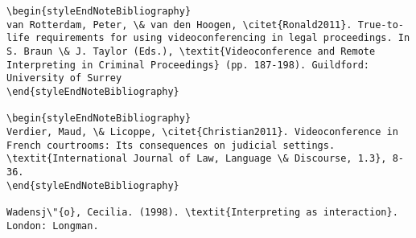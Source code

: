 \documentclass[output=paper]{langsci/langscibook}
\begin{document}
\begin{verbatim}
\begin{styleEndNoteBibliography}
van Rotterdam, Peter, \& van den Hoogen, \citet{Ronald2011}. True-to-life requirements for using videoconferencing in legal proceedings. In S. Braun \& J. Taylor (Eds.), \textit{Videoconference and Remote Interpreting in Criminal Proceedings} (pp. 187-198). Guildford: University of Surrey 
\end{styleEndNoteBibliography}

\begin{styleEndNoteBibliography}
Verdier, Maud, \& Licoppe, \citet{Christian2011}. Videoconference in French courtrooms: Its consequences on judicial settings. \textit{International Journal of Law, Language \& Discourse, 1.3}, 8-36. 
\end{styleEndNoteBibliography}

Wadensj\"{o}, Cecilia. (1998). \textit{Interpreting as interaction}. London: Longman.


\end{verbatim} 
\sloppy
\printbibliography[heading=subbibliography,notkeyword=this] 
\end{document}
